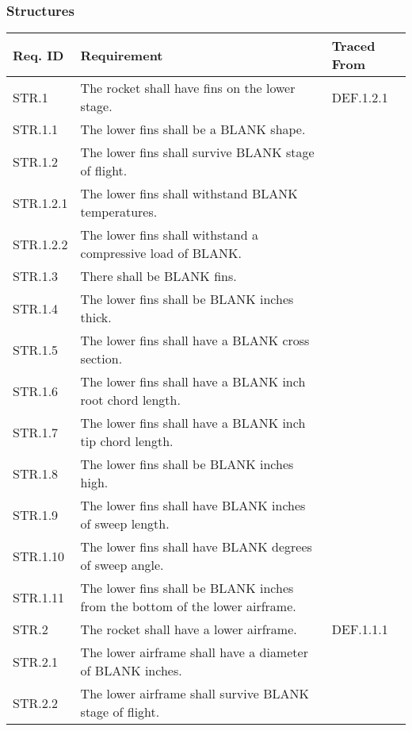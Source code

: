 \subsubsection{Structures}
\begin{table}[htbp] 
    \centering
    \footnotesize 
    \setlength{\tymin}{40pt}
    \let\raggedright\RaggedRight
    
    \begin{tabulary}{\textwidth}{@{}LLL@{}}
    \toprule
        \textbf{Req. ID} & \textbf{Requirement} & \textbf{Traced From} \\
    \midrule
        STR.1 & The rocket shall have fins on the lower stage. & DEF.1.2.1 \\
        STR.1.1 & The lower fins shall be a BLANK shape. &  \\
        STR.1.2 & The lower fins shall survive BLANK stage of flight. &  \\
        STR.1.2.1 & The lower fins shall withstand BLANK temperatures. &  \\
        STR.1.2.2 & The lower fins shall withstand a compressive load of BLANK. &  \\
        STR.1.3 & There shall be BLANK fins. &  \\
        STR.1.4 & The lower fins shall be BLANK inches thick. &  \\
        STR.1.5 & The lower fins shall have a BLANK cross section. &  \\
        STR.1.6 & The lower fins shall have a BLANK inch root chord length. &  \\
        STR.1.7 & The lower fins shall have a BLANK inch tip chord length. &  \\
        STR.1.8 & The lower fins shall be BLANK inches high. &  \\
        STR.1.9 & The lower fins shall have BLANK inches of sweep length. &  \\
        STR.1.10 & The lower fins shall have BLANK degrees of sweep angle. &  \\
        STR.1.11 & The lower fins shall be BLANK inches from the bottom of the lower airframe. &  \\
    \midrule
        STR.2 & The rocket shall have a lower airframe. & DEF.1.1.1 \\
        STR.2.1 & The lower airframe shall have a diameter of BLANK inches. &  \\
        STR.2.2 & The lower airframe shall survive BLANK stage of flight. &  \\

\end{tabulary}
\end{table}
